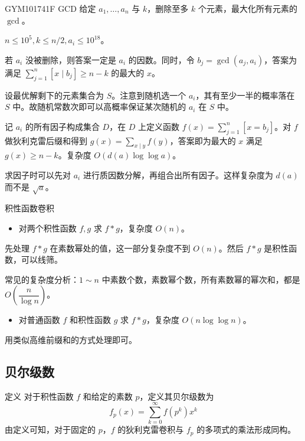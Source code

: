 \documentclass [hyperref={bookmarksdepth=4}, aspectratio=169] {beamer}
\theoremstyle {fy}
\begin{document}
\begin{frame}{GYM101741F GCD}
给定 $a_1,\dots,a_n$ 与 $k$，删除至多 $k$ 个元素，最大化所有元素的 $\gcd$。

$n\le 10^5,k\le n/2,a_i\le 10^{18}$。

若 $a_i$ 没被删除，则答案一定是 $a_i$ 的因数。同时，令 $b_j=\gcd(a_j,a_i)$，答案为满足 $\sum\limits_{j=1}^n[x\mid b_j]\ge n-k$ 的最大的 $x$。

设最优解剩下的元素集合为 $S$。注意到随机选一个 $a_i$，其有至少一半的概率落在 $S$ 中。故随机常数次即可以高概率保证某次随机的 $a_i$ 在 $S$ 中。

记 $a_i$ 的所有因子构成集合 $D$，在 $D$ 上定义函数 $f(x)=\sum\limits_{j=1}^n[x=b_j]$。对 $f$ 做狄利克雷后缀和得到 $g(x)=\sum\limits_{x\mid y}f(y)$，答案即为最大的 $x$ 满足 $g(x)\ge n-k$。复杂度 $O(d(a)\log\log a)$。

求因子时可以先对 $a_i$ 进行质因数分解，再组合出所有因子。这样复杂度为 $d(a)$ 而不是 $\sqrt a$。
\end{frame}

\begin{frame}{积性函数卷积}
\begin{itemize}
    \item 对两个积性函数 $f,g$ 求 $f*g$，复杂度 $O(n)$。
\end{itemize}

先处理 $f*g$ 在素数幂处的值，这一部分复杂度不到 $O(n)$。然后 $f*g$ 是积性函数，可以线筛。

常见的复杂度分析：$1\sim n$ 中素数个数，素数幂个数，所有素数幂的幂次和，都是 $O(\dfrac{n}{\log n})$。

\begin{itemize}
    \item 对普通函数 $f$ 和积性函数 $g$ 求 $f*g$，复杂度 $O(n\log\log n)$。
\end{itemize}

用类似高维前缀和的方式处理即可。
\end{frame}

\subsection{贝尔级数}

\begin{frame}{定义}
对于积性函数 $f$ 和给定的素数 $p$，定义其贝尔级数为
$$
f_p(x)=\sum_{k=0}^{\infty} f(p^k)x^k
$$
由定义可知，对于固定的 $p$，$f$ 的狄利克雷卷积与 $f_p$ 的多项式的乘法形成同构。
\end{frame}
\end{document}
